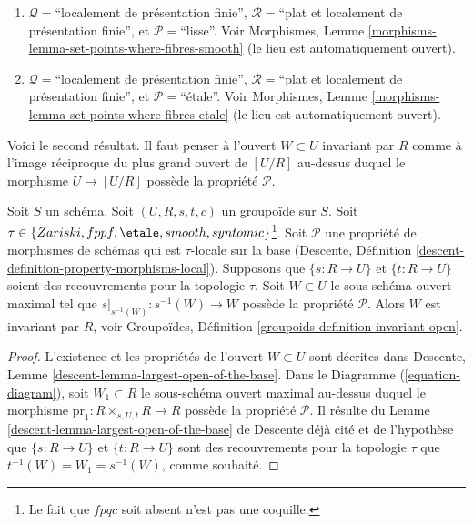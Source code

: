 \begin{remark}
\begin{enumerate}
$\mathcal{R} =$``plat et localement de présentation finie'', et
$\mathcal{P}=$``syntomique'' ; voir
Morphismes, Lemme \ref{morphisms-lemma-set-points-where-fibres-lci}
(le lieu est automatiquement ouvert).
\item[(7)] $\mathcal{Q} =$``localement de présentation finie'',
$\mathcal{R} =$``plat et localement de présentation finie'', et
$\mathcal{P}=$``lisse''. Voir
Morphismes, Lemme \ref{morphisms-lemma-set-points-where-fibres-smooth}
(le lieu est automatiquement ouvert).
\item[(8)] $\mathcal{Q} =$``localement de présentation finie'',
$\mathcal{R} =$``plat et localement de présentation finie'', et
$\mathcal{P}=$``\'etale''. Voir
Morphismes, Lemme \ref{morphisms-lemma-set-points-where-fibres-etale}
(le lieu est automatiquement ouvert).
\end{enumerate}
\end{remark}

\noindent
Voici le second résultat. Il faut penser à l'ouvert $W \subset U$ invariant par $R$ comme à
l'image réciproque du plus grand ouvert de $[U/R]$ au-dessus duquel
le morphisme $U \to [U/R]$ possède la propriété $\mathcal{P}$.

\begin{lemma}
\label{lemma-property-invariant}
Soit $S$ un schéma.
Soit $(U, R, s, t, c)$ un groupoïde sur $S$.
Soit $\tau \in \{Zariski, \linebreak[0] fppf,
\linebreak[0] \etale, \linebreak[0]
smooth, \linebreak[0] syntomic\}$\footnote{Le fait que $fpqc$ soit absent
n'est pas une coquille.}. Soit $\mathcal{P}$ une propriété de morphismes de schémas
qui est $\tau$-locale sur la base
(Descente, Définition \ref{descent-definition-property-morphisms-local}).
Supposons que $\{s : R \to U\}$ et $\{t : R \to U\}$ soient des recouvrements pour la
topologie $\tau$. Soit $W \subset U$ le sous-schéma ouvert maximal tel que
$s|_{s^{-1}(W)} : s^{-1}(W) \to W$ possède la propriété $\mathcal{P}$.
Alors $W$ est invariant par $R$, voir
Groupoïdes, Définition \ref{groupoids-definition-invariant-open}.
\end{lemma}

\begin{proof}
L'existence et les propriétés de l'ouvert $W \subset U$ sont décrites dans
Descente, Lemme \ref{descent-lemma-largest-open-of-the-base}.
Dans le
Diagramme (\ref{equation-diagram}),
soit $W_1 \subset R$ le sous-schéma ouvert maximal au-dessus duquel le morphisme
$\text{pr}_1 : R \times_{s, U, t} R \to R$ possède la propriété $\mathcal{P}$.
Il résulte du
Lemme \ref{descent-lemma-largest-open-of-the-base} de Descente déjà cité
et de l'hypothèse que $\{s : R \to U\}$ et $\{t : R \to U\}$ sont des recouvrements
pour la topologie $\tau$ que $t^{-1}(W) = W_1 = s^{-1}(W)$, comme souhaité.
\end{proof}

